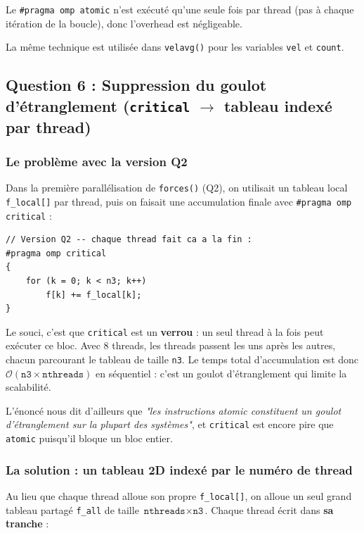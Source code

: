 \documentclass[12pt,a4paper]{article}
\begin{document}
Le \texttt{\#pragma omp atomic} n'est exécuté qu'une seule fois par thread (pas à chaque itération de la boucle), donc l'overhead est négligeable.

La même technique est utilisée dans \texttt{velavg()} pour les variables \texttt{vel} et \texttt{count}.


\subsection{Question 6 : Suppression du goulot d'étranglement (\texttt{critical} $\to$ tableau indexé par thread)}

\subsubsection{Le problème avec la version Q2}

Dans la première parallélisation de \texttt{forces()} (Q2), on utilisait un tableau local \texttt{f\_local[]} par thread, puis on faisait une accumulation finale avec \texttt{\#pragma omp critical} :

\begin{lstlisting}[title={\color{warnborder} Version Q2 --- goulot d'etranglement}]
// Version Q2 -- chaque thread fait ca a la fin :
#pragma omp critical
{
    for (k = 0; k < n3; k++)
        f[k] += f_local[k];
}
\end{lstlisting}

Le souci, c'est que \texttt{critical} est un \textbf{verrou} : un seul thread à la fois peut exécuter ce bloc. Avec 8 threads, les threads passent les uns après les autres, chacun parcourant le tableau de taille \texttt{n3}. Le temps total d'accumulation est donc $\mathcal{O}(\texttt{n3} \times \texttt{nthreads})$ en séquentiel : c'est un goulot d'étranglement qui limite la scalabilité.

L'énoncé nous dit d'ailleurs que \textit{"les instructions atomic constituent un goulot d'étranglement sur la plupart des systèmes"}, et \texttt{critical} est encore pire que \texttt{atomic} puisqu'il bloque un bloc entier.

\subsubsection{La solution : un tableau 2D indexé par le numéro de thread}

Au lieu que chaque thread alloue son propre \texttt{f\_local[]}, on alloue un seul grand tableau partagé \texttt{f\_all} de taille $\texttt{nthreads} \times \texttt{n3}$. Chaque thread écrit dans \textbf{sa tranche} :
\end{document}
